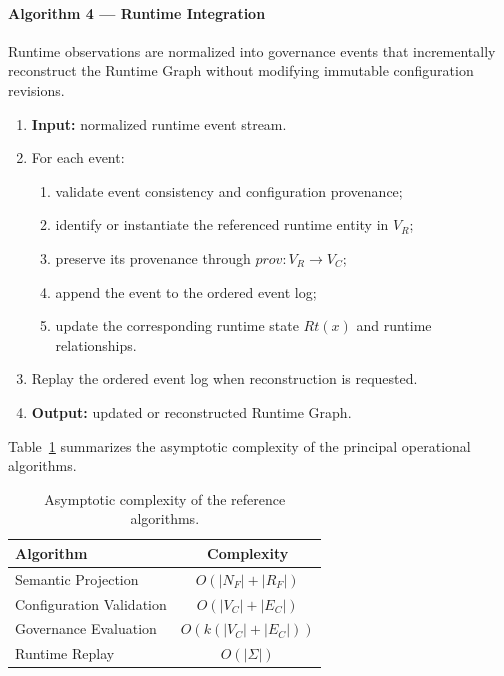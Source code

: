 \documentclass[10pt]{article}
\begin{document}
\paragraph{Algorithm 4 --- Runtime Integration}

Runtime observations are normalized into governance events that incrementally
reconstruct the Runtime Graph without modifying immutable configuration
revisions.

\begin{algorithm}[t]
	\caption{Runtime Integration}
	\begin{enumerate}
		\item \textbf{Input:} normalized runtime event stream.
		\item For each event:
		\begin{enumerate}
			\item validate event consistency and configuration provenance;
			\item identify or instantiate the referenced runtime entity in $V_R$;
			\item preserve its provenance through $prov:V_R\rightarrow V_C$;
			\item append the event to the ordered event log;
			\item update the corresponding runtime state $Rt(x)$ and runtime relationships.
		\end{enumerate}
		\item Replay the ordered event log when reconstruction is requested.
		\item \textbf{Output:} updated or reconstructed Runtime Graph.
	\end{enumerate}
\end{algorithm}

Table~\ref{tab:algorithm_complexity} summarizes the asymptotic complexity of the principal operational algorithms.

\begin{table}[t]
	\centering
	\caption{Asymptotic complexity of the reference algorithms.}
	\label{tab:algorithm_complexity}
	\small
	\begin{tabular}{lc}
		\toprule
		\textbf{Algorithm} & \textbf{Complexity} \\
		\midrule
		Semantic Projection & $O(|N_F|+|R_F|)$ \\
		Configuration Validation & $O(|V_C|+|E_C|)$ \\
		Governance Evaluation & $O(k(|V_C|+|E_C|))$ \\
		Runtime Replay & $O(|\Sigma|)$ \\
		\bottomrule
	\end{tabular}
\end{table}
\end{document}
